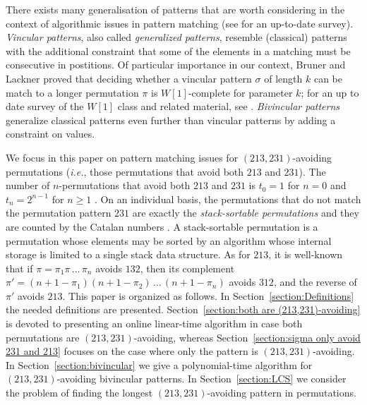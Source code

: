 \documentclass[a4paper]{llncs}
\newcounter{num}
\begin{document}
	There exists many generalisation of patterns that are worth considering
	in the context of algorithmic issues in pattern matching
	(see \cite{Kitaev:book:2011} for an up-to-date survey).
	\emph{Vincular patterns}, also called
	\emph{generalized patterns},
	resemble (classical) patterns with the additional constraint that some of the elements in
	a matching must be consecutive in postitions.
	Of particular importance in our context,
	Bruner and Lackner \cite{DBLP:journals/corr/abs-1204-5224}
	proved that deciding whether a vincular pattern
	$\sigma$ of length $k$ can be match to a longer permutation
	$\pi$ is $W[1]$-complete for
	parameter $k$;
	for an up to date survey of the $W[1]$ class and related material, see
	\cite{Downey:Fellows:2013}.
	\emph{Bivincular patterns} generalize classical patterns even further
	than vincular
	patterns by adding a constraint on values.

	We focus in this paper on pattern matching issues for
	$(213,231)$-avoiding permutations
    (\emph{i.e.}, those permutations that avoid both $213$ and $231$).
	The number of $n$-permutations that avoid both
	$213$ and $231$ is
	$t_0 = 1$ for $n = 0$ and
	$t_n =2^{n-1}$ for $n\geq 1$ \cite{Simion:Schmidt:EJC:1985}.
	On an individual basis,
	the permutations that do not match the permutation pattern $231$
	are exactly the \emph{stack-sortable permutations} and they are counted by
	the Catalan numbers \cite{Knuth:1997:ACP:260999}.
	A stack-sortable permutation is a permutation whose elements may be sorted by
	an algorithm whose internal storage is limited to a single stack data structure.
	As for $213$, it is well-known that
 	if $\pi = \pi_1\pi\,\ldots\,\pi_n$ avoids $132$, then its complement
 	$\pi' = (n+1-\pi_1)(n+1-\pi_2)\,\ldots\,(n+1-\pi_n)$ avoids $312$, and
 	the reverse of $\pi'$ avoids $213$.
	This paper is organized as follows.
	In Section~\ref{section:Definitions} the needed definitions are presented.
	Section~\ref{section:both are (213,231)-avoiding} is devoted to presenting
	an online linear-time algorithm in case both 
	permutations are $(213,231)$-avoiding,
	whereas Section~\ref{section:sigma only avoid 231 and 213} focuses on the case
	where only the pattern is $(213,231)$-avoiding.
	In Section~\ref{section:bivincular} we give a polynomial-time algorithm
	for $(213,231)$-avoiding bivincular patterns.
	In Section~\ref{section:LCS} we consider the problem of finding the longest
	$(213,231)$-avoiding pattern in permutations.
\end{document}
